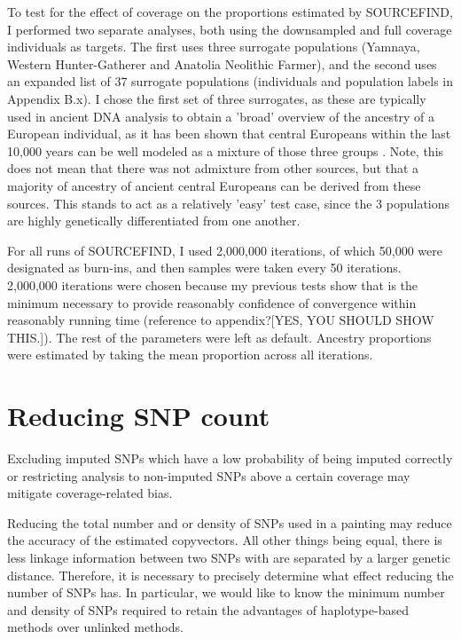 To test for the effect of coverage on the proportions estimated by SOURCEFIND, I performed two separate analyses, both using the downsampled and full coverage individuals as targets. The first uses three surrogate populations (Yamnaya, Western Hunter-Gatherer and Anatolia Neolithic Farmer), and the second uses an expanded list of 37 surrogate populations (individuals and population labels in Appendix B.x). I chose the first set of three surrogates, as these are typically used in ancient DNA analysis to obtain a 'broad' overview of the ancestry of a European individual, as it has been shown that central Europeans within the last 10,000 years can be well modeled as a mixture of those three groups \cite{Lazaridis2014, Haak2015}. Note, this does not mean that there was not admixture from other sources, but that a majority of ancestry of ancient central Europeans can be derived from these sources. This stands to act as a relatively 'easy' test case, since the 3 populations are highly genetically differentiated from one another.

For all runs of SOURCEFIND, I used 2,000,000 iterations, of which 50,000 were designated as burn-ins, and then samples were taken every 50 iterations. 2,000,000 iterations were chosen because my previous tests show that is the minimum necessary to provide reasonably confidence of convergence within reasonably running time (reference to appendix?{\color{red}[YES, YOU SHOULD SHOW THIS.]}). The rest of the parameters were left as default. Ancestry proportions were estimated by taking the mean proportion across all iterations. 

\section{Reducing SNP count}

Excluding imputed SNPs which have a low probability of being imputed correctly or restricting analysis to non-imputed SNPs above a certain coverage may mitigate coverage-related bias.

Reducing the total number and or density of SNPs used in a painting may reduce the accuracy of the estimated copyvectors. All other things being equal, there is less linkage information between two SNPs with are separated by a larger genetic distance. Therefore, it is necessary to precisely determine what effect reducing the number of SNPs has. In particular, we would like to know the minimum number and density of SNPs required to retain the advantages of haplotype-based methods over unlinked methods. 

